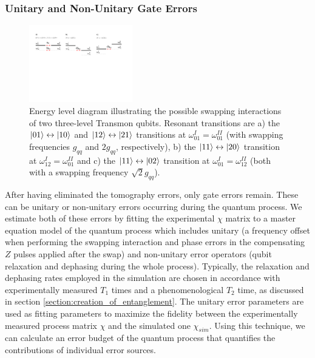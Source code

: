 \subsubsection{Unitary and Non-Unitary Gate Errors}

\begin{figure}
	\centering
	\includegraphics[width=0.4\textwidth]{./material/figures/2-qubit-processor/swap_energy_levels}
	\caption{Energy level diagram illustrating the possible swapping interactions of two three-level Transmon qubits. Resonant transitions are a)  the $\left| 01 \right>\leftrightarrow\left| 10 \right>$ and $\left| 12 \right>\leftrightarrow\left| 21 \right>$ transitions at $\omega_{01}^I = \omega_{01}^{II}$ (with swapping frequencies $g_{qq}$ and $2g_{qq}$, respectively), b) the $\left| 11 \right>\leftrightarrow\left| 20 \right>$ transition at $\omega_{12}^{I} = \omega_{01}^{II}$ and c) the $\left| 11 \right>\leftrightarrow\left| 02 \right>$ transition at $\omega_{01}^I = \omega_{12}^{II}$ (both with a swapping frequency $\sqrt{2}g_{qq}$).}
	\label{fig:swap_energy_levels}
\end{figure}

After having eliminated the tomography errors, only gate errors remain. These can be unitary or non-unitary errors occurring during the quantum process. We estimate both of these errors by fitting the experimental $\chi$ matrix to a master equation model of the quantum process which includes unitary (a frequency offset when performing the swapping interaction and phase errors in the compensating $Z$ pulses applied after the swap) and non-unitary error operators (qubit relaxation and dephasing during the whole process). Typically, the relaxation and dephasing rates employed in the simulation are chosen in accordance with experimentally measured $T_1$ times and a phenomenological $T_2$ time, as discussed in section \ref{section:creation_of_entanglement}. The unitary error parameters are used as fitting parameters to maximize the fidelity between the experimentally measured process matrix $\chi$ and the simulated one $\chi_{sim}$. Using this technique, we can calculate an error budget of the quantum process that quantifies the contributions of individual error sources. 

